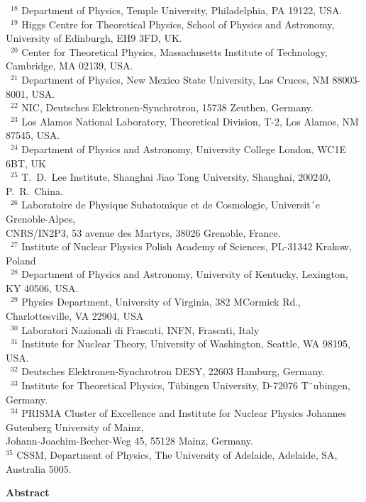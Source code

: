 \documentclass[twoside,12pt]{article}
\numberwithin{equation}{section}
\numberwithin{figure}{section}
\numberwithin{table}{section}
\begin{document}
\begin{center}
{~$^{18}$ Department of Physics, Temple University, Philadelphia, PA 19122, USA. \\
~$^{19}$ Higgs Centre for Theoretical Physics, School of
Physics and Astronomy,\\ University of Edinburgh, EH9 3FD, UK. \\
~$^{20}$ Center for Theoretical Physics, Massachusetts Institute of Technology, Cambridge, MA 02139, USA. \\
~$^{21}$ Department of Physics, New Mexico State University, Las Cruces, NM 88003-8001, USA. \\
~$^{22}$ NIC, Deutsches Elektronen-Synchrotron, 15738 Zeuthen, Germany.\\
~$^{23}$ Los Alamos National Laboratory, Theoretical Division, T-2, Los Alamos, NM 87545, USA. \\
~$^{24}$ Department of Physics and Astronomy, University College London, WC1E 6BT, UK \\
~$^{25}$ T.~D.~Lee Institute, Shanghai Jiao Tong University, Shanghai, 200240, P.~R.~China. \\
~$^{26}$ Laboratoire de Physique Subatomique et de Cosmologie, Universit´e Grenoble-Alpes,\\ 
  CNRS/IN2P3, 53 avenue des Martyrs,  38026 Grenoble, France. \\
~$^{27}$ Institute of Nuclear Physics Polish Academy of Sciences, PL-31342 Krakow, Poland \\
~$^{28}$ Department of Physics and Astronomy, University of Kentucky, 
Lexington, KY 40506, USA. \\
~$^{29}$ Physics Department, University of Virginia, 382 MCormick Rd.,
Charlottesville, VA 22904, USA \\
~$^{30}$ Laboratori Nazionali di Frascati, INFN, Frascati, Italy \\
~$^{31}$ Institute for Nuclear Theory, University of Washington, Seattle, WA 98195, USA. \\
~$^{32}$ Deutsches Elektronen-Synchrotron DESY, 22603 Hamburg, Germany. \\
~$^{33}$ Institute for Theoretical Physics, T\"ubingen University, D-72076 T¨ubingen, Germany. \\
~$^{34}$ PRISMA Cluster of Excellence and Institute for Nuclear Physics 
Johannes Gutenberg University of Mainz, \\ Johann-Joachim-Becher-Weg 45, 55128 Mainz, Germany. \\
$^{35}$ CSSM, Department of Physics, The University of Adelaide, Adelaide, SA, Australia 5005.\\
}

\clearpage


$\quad$\\
\vspace{1.5cm}
{\bf \large Abstract}


\end{center}
\end{document}
